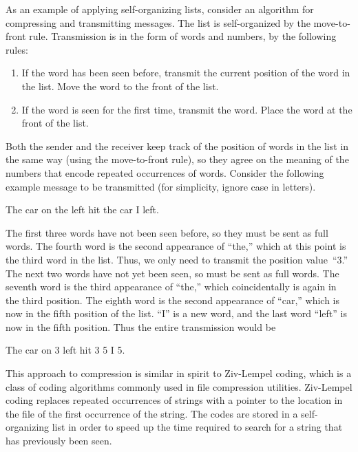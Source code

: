 As an example of applying self-organizing lists, consider an
algorithm for compressing and transmitting messages.
The list is self-organized by the move-to-front rule.
Transmission is in the form of words and numbers, by the following
rules:

\begin{enumerate}

\item
If the word has been seen before, transmit the current position of the
word in the list.
Move the word to the front of the list.

\item
If the word is seen for the first time, transmit the word.
Place the word at the front of the list.
\end{enumerate}

Both the sender and the receiver keep track of the position of words
in the list in the same way (using the move-to-front rule), so
they agree on the meaning of the numbers that encode repeated
occurrences of words.
Consider the following example message to be transmitted
(for simplicity, ignore case in letters).

\vspace{-\smallskipamount}
\begin{center}
The car on the left hit the car I left.
\end{center}

\vspace{-\smallskipamount}
The first three words have not been seen before, so they must be sent
as full words.
The fourth word is the second appearance of ``the,'' which at this
point is the third word in the list.
Thus, we only need to transmit the position value~``3.''
The next two words have not yet been seen, so must be sent as full words.
The seventh word is the third appearance of ``the,'' which coincidentally
is again in the third position.
The eighth word is the second appearance of ``car,'' which is now in the
fifth position of the list.
``I'' is a new word, and the last word ``left'' is now in the fifth
position.
Thus the entire transmission would be

\vspace{-\smallskipamount}
\begin{center}
The car on 3 left hit 3 5 I 5.
\end{center}

\vspace{-\smallskipamount}
This approach to compression is similar in spirit to
Ziv-Lempel coding, which is
a class of coding algorithms commonly used in file compression
utilities.
Ziv-Lempel coding replaces repeated occurrences of strings with a
pointer to the location in the file of the first occurrence of the
string.
The codes are stored in a self-organizing list in order to speed
up the time required to search for a string that has previously been
seen.

